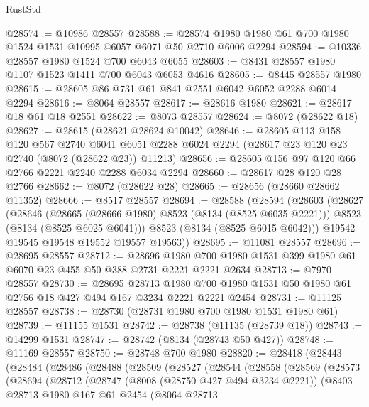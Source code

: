 \begin{lexlean}{RustStd}
\begin{coremodule}
@28574 := @10986 @28557
@28588 := @28574 @1980 @1980 @61 @700 @1980 @1524 @1531 @10995 @6057 @6071 @50 @2710 @6006 @2294
@28594 := @10336 @28557 @1980 @1524 @700 @6043 @6055
@28603 := @8431 @28557 @1980 @1107 @1523 @1411 @700 @6043 @6053 @4616
@28605 := @8445 @28557 @1980
@28615 := @28605 @86 @731 @61 @841 @2551 @6042 @6052 @2288 @6014 @2294
@28616 := @8064 @28557
@28617 := @28616 @1980
@28621 := @28617 @18 @61 @18 @2551
@28622 := @8073 @28557
@28624 := @8072 (@28622 @18)
@28627 := @28615 (@28621 @28624 @10042)
@28646 := @28605
    @113
    @158
    @120
    @567
    @2740
    @6041
    @6051
    @2288
    @6024
    @2294
    (@28617 @23 @120 @23 @2740 (@8072 (@28622 @23)) @11213)
@28656 := @28605 @156 @97 @120 @66 @2766 @2221 @2240 @2288 @6034 @2294
@28660 := @28617 @28 @120 @28 @2766
@28662 := @8072 (@28622 @28)
@28665 := @28656 (@28660 @28662 @11352)
@28666 := @8517 @28557
@28694 := @28588
    (@28594
      (@28603
        (@28627
          (@28646
            (@28665 (@28666 @1980) @8523 (@8134 (@8525 @6035 @2221)))
            @8523
            (@8134 (@8525 @6025 @6041)))
          @8523
          (@8134 (@8525 @6015 @6042)))
        @19542
        @19545
        @19548
        @19552
        @19557
        @19563))
@28695 := @11081 @28557
@28696 := @28695 @28557
@28712 := @28696
    @1980
    @700
    @1980
    @1531
    @399
    @1980
    @61
    @6070
    @23
    @455
    @50
    @388
    @2731
    @2221
    @2221
    @2634
@28713 := @7970 @28557
@28730 := @28695
    @28713
    @1980
    @700
    @1980
    @1531
    @50
    @1980
    @61
    @2756
    @18
    @427
    @494
    @167
    @3234
    @2221
    @2221
    @2454
@28731 := @11125 @28557
@28738 := @28730 (@28731 @1980 @700 @1980 @1531 @1980 @61)
@28739 := @11155 @1531
@28742 := @28738 (@11135 (@28739 @18))
@28743 := @14299 @1531
@28747 := @28742 (@8134 (@28743 @50 @427))
@28748 := @11169 @28557
@28750 := @28748 @700 @1980
@28820 := @28418
    (@28443
      (@28484
        (@28486
          (@28488
            (@28509
              (@28527
                (@28544
                  (@28558
                    (@28569
                      (@28573
                        (@28694
                          (@28712
                            (@28747
                              (@8008 (@28750 @427 @494 @3234 @2221))
                              (@8403
                                @28713
                                @1980
                                @167
                                @61
                                @2454
                                (@8064
                                  @28713

\end{coremodule}
\end{lexlean}
